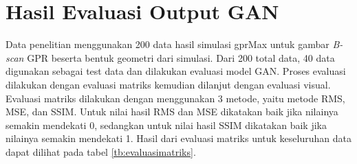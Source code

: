 \section{Hasil Evaluasi Output GAN}
\label{sec:evaluasiOutput}

Data penelitian menggunakan 200 data hasil simulasi gprMax untuk gambar \emph{B-scan} GPR beserta bentuk geometri dari simulasi. 
Dari 200 total data, 40 data digunakan sebagai test data dan dilakukan evaluasi model GAN. 
Proses evaluasi dilakukan dengan evaluasi matriks kemudian dilanjut dengan evaluasi visual. 
Evaluasi matriks dilakukan dengan menggunakan 3 metode, yaitu metode RMS, MSE, dan SSIM. 
Untuk nilai hasil RMS dan MSE dikatakan baik jika nilainya semakin mendekati 0, sedangkan untuk nilai hasil SSIM dikatakan baik jika nilainya semakin mendekati 1. 
Hasil dari evaluasi matriks untuk keseluruhan data dapat dilihat pada tabel \ref{tb:evaluasimatriks}. 

